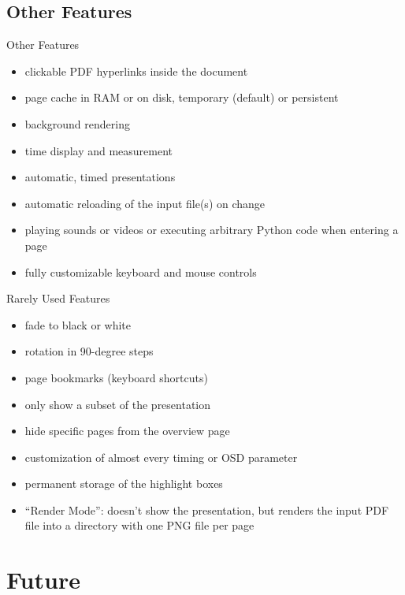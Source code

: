 \documentclass[bigger,hyperref={colorlinks=true,linkcolor=white,urlcolor=blue}]{beamer}
\begin{document}
\subsection{Other Features}
\begin{frame}{Other Features}
    \begin{itemize}
        \item clickable PDF hyperlinks inside the document
        \item page cache in RAM or on disk, temporary (default) or persistent
        \item background rendering
        \item time display and measurement
        \item automatic, timed presentations
        \item automatic reloading of the input file(s) on change
        \item playing sounds or videos or executing arbitrary Python code
              when entering a page
        \item fully customizable keyboard and mouse controls
    \end{itemize}
\end{frame}
\begin{frame}{Rarely Used Features}
    \begin{itemize}
        \item fade to black or white
        \item rotation in 90-degree steps
        \item page bookmarks (keyboard shortcuts)
        \item only show a subset of the presentation
        \item hide specific pages from the overview page
        \item customization of almost every timing or OSD parameter
        \item permanent storage of the highlight boxes
        \item ``Render Mode'': doesn't show the presentation, but
              renders the input PDF file into a directory with one PNG file
              per page
    \end{itemize}
\end{frame}


\section{Future}
\end{document}
